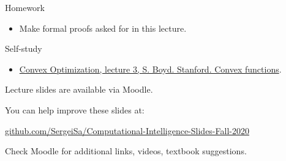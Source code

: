 \documentclass{beamer}
\begin{document}
\begin{frame}{Homework}
\begin{flushleft}

\begin{itemize}
    \item Make formal proofs asked for in this lecture.
\end{itemize}

\end{flushleft}
\end{frame}


\begin{frame}{Self-study}
\begin{flushleft}

\begin{itemize}
    \item \href{https://www.youtube.com/watch?v=kcOodzDGV4c}{Convex Optimization, lecture 3, S. Boyd. Stanford. Convex functions}.
\end{itemize}

\end{flushleft}
\end{frame}



\begin{frame}
\centerline{Lecture slides are available via Moodle.}
\bigskip
\centerline{You can help improve these slides at:}

\centerline{\href{https://github.com/SergeiSa/Computational-Intelligence-Slides-Fall-2020}{github.com/SergeiSa/Computational-Intelligence-Slides-Fall-2020}}


\bigskip
\centerline{Check Moodle for additional links, videos, textbook suggestions.}
\end{frame}
\end{document}
